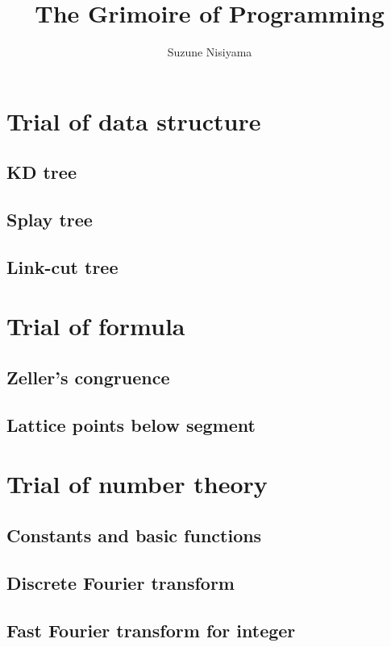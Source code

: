 \documentclass[UTF8,a4paper]{report}
\title{The Grimoire of Programming}
\date{}
\author{Suzune Nisiyama}
\begin{document}
	\tableofcontents
	\chapter{Trial of data structure}
		\section{KD tree}
			
		\section{Splay tree}
			
		\section{Link-cut tree}
			
	\chapter{Trial of formula}
		\section{Zeller's congruence}
			
		\section{Lattice points below segment}
			
	\chapter{Trial of number theory}
		\section{Constants and basic functions}
			
		\section{Discrete Fourier transform}
			
		\section{Fast Fourier transform for integer}
			
\end{document}
